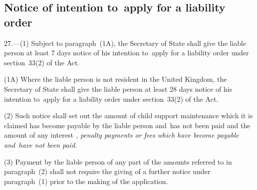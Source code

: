 \documentclass[12pt,a4paper]{article}
\begin{document}
\subsection[27. Notice of intention to~apply for a liability order]{Notice of intention to~apply for a liability order}

27.—(1) 
Subject to paragraph~(1A),  %
the Secretary of State shall give the liable person at least 7 days notice of his intention to~apply for a liability order under section~33(2) of the Act.

(1A) Where the liable person is not resident in the United Kingdom, the Secretary of State shall give the liable person at least 28 days notice of his intention to~apply for a liability order under section~33(2) of the Act.

(2) Such notice shall set out the amount of child support maintenance which it is claimed has become payable by the liable person and~has not been paid and the amount of any interest%
\emph{, penalty payments or fees which have become payable and~have not been paid}.  %

(3) Payment by the liable person of any part of the amounts referred to in paragraph~(2) shall not require the giving of a further notice under paragraph~(1) prior to the making of the application.

\end{document}
